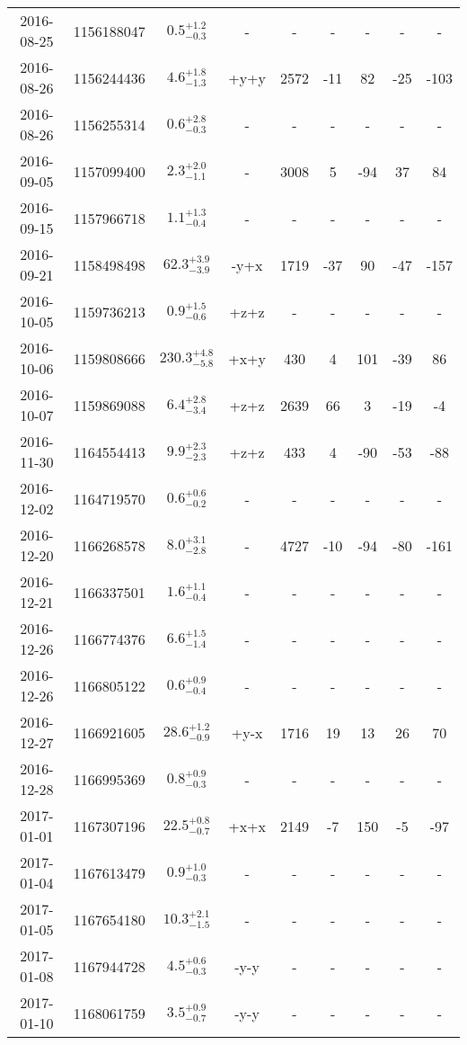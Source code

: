 \documentclass[preprint, trackchanges]{aastex61}
\begin{document}
\begin{longtable}{|c|c|c|c|c|c|c|c|c|}
	2016-08-25 & 1156188047 & $ 0.5^{+1.2}_{-0.3}$ & - & - & - & - & - & - \\
	2016-08-26 & 1156244436 & $ 4.6^{+1.8}_{-1.3}$ & +y+y & 2572 & -11 & 82 & -25 & -103 \\
	2016-08-26 & 1156255314 & $ 0.6^{+2.8}_{-0.3}$ & - & - & - & - & - & - \\
	2016-09-05 & 1157099400 & $ 2.3^{+2.0}_{-1.1}$ & - & 3008 & 5 & -94 & 37 & 84 \\
	2016-09-15 & 1157966718 & $ 1.1^{+1.3}_{-0.4}$ & - & - & - & - & - & - \\
	2016-09-21 & 1158498498 & $62.3^{+3.9}_{-3.9}$ & -y+x & 1719 & -37 & 90 & -47 & -157 \\
	2016-10-05 & 1159736213 & $ 0.9^{+1.5}_{-0.6}$ & +z+z & - & - & - & - & - \\
	2016-10-06 & 1159808666 & $230.3^{+4.8}_{-5.8}$ & +x+y & 430 & 4 & 101 & -39 & 86 \\
	2016-10-07 & 1159869088 & $ 6.4^{+2.8}_{-3.4}$ & +z+z & 2639 & 66 & 3 & -19 & -4 \\
	2016-11-30 & 1164554413 & $ 9.9^{+2.3}_{-2.3}$ & +z+z & 433 & 4 & -90 & -53 & -88 \\
	2016-12-02 & 1164719570 & $ 0.6^{+0.6}_{-0.2}$ & - & - & - & - & - & - \\
	2016-12-20 & 1166268578 & $ 8.0^{+3.1}_{-2.8}$ & - & 4727 & -10 & -94 & -80 & -161 \\
	2016-12-21 & 1166337501 & $ 1.6^{+1.1}_{-0.4}$ & - & - & - & - & - & - \\
	2016-12-26 & 1166774376 & $ 6.6^{+1.5}_{-1.4}$ & - & - & - & - & - & - \\
	2016-12-26 & 1166805122 & $ 0.6^{+0.9}_{-0.4}$ & - & - & - & - & - & - \\
	2016-12-27 & 1166921605 & $28.6^{+1.2}_{-0.9}$ & +y-x & 1716 & 19 & 13 & 26 & 70 \\
	2016-12-28 & 1166995369 & $ 0.8^{+0.9}_{-0.3}$ & - & - & - & - & - & - \\
	2017-01-01 & 1167307196 & $22.5^{+0.8}_{-0.7}$ & +x+x & 2149 & -7 & 150 & -5 & -97 \\
	2017-01-04 & 1167613479 & $ 0.9^{+1.0}_{-0.3}$ & - & - & - & - & - & - \\
	2017-01-05 & 1167654180 & $10.3^{+2.1}_{-1.5}$ & - & - & - & - & - & - \\
	2017-01-08 & 1167944728 & $ 4.5^{+0.6}_{-0.3}$ & -y-y & - & - & - & - & - \\
	2017-01-10 & 1168061759 & $ 3.5^{+0.9}_{-0.7}$ & -y-y & - & - & - & - & - \\

\end{longtable}
\end{document}
